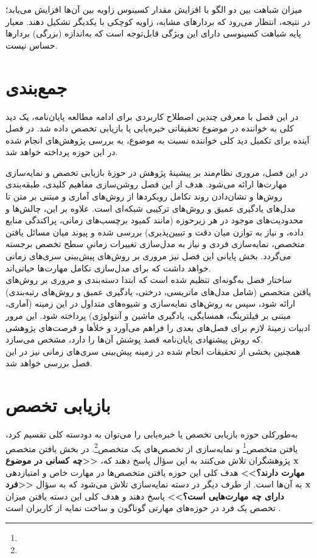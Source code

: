 میزان شباهت بین دو الگو با افزایش مقدار کسینوس زاویه بین آن‌ها افزایش می‌یابد؛ در نتیجه، انتظار می‌رود که بردارهای مشابه، زاویه کوچکی با یکدیگر تشکیل دهند. معیار پایه شباهت کسینوسی دارای این ویژگی قابل‌توجه است که به‌اندازه (بزرگی) بردارها حساس نیست.\cite{XIA201539}

\section{جمع‌بندی}
در این فصل با معرفی چندین اصطلاح کاربردی برای ادامه مطالعه پایان‌نامه، یک دید کلی به خواننده در موضوع تحقیقاتی خبره‌یابی یا بازیابی تخصص داده شد. در فصل آینده برای تکمیل دید کلی خواننده نسبت به موضوع، به بررسی پژوهش‌های انجام شده در این حوزه پرداخته خواهد شد. 


در این فصل، مروری نظام‌مند بر پیشینهٔ پژوهش در حوزهٔ بازیابی تخصص و نمایه‌سازی مهارت‌ها ارائه می‌شود. هدف از این فصل روشن‌سازی مفاهیم کلیدی، طبقه‌بندی روش‌ها و نشان‌دادن روند تکامل رویکردها از روش‌های آماری و مبتنی بر متن تا مدل‌های یادگیری عمیق و روش‌های ترکیبی شبکه‌ای است. علاوه بر این، چالش‌ها و محدودیت‌های موجود در هر زیرحوزه (مانند کمبود برچسب‌های زمانی، پراکندگی منابع داده، و نیاز به توازن میان دقت و تبیین‌پذیری) بررسی شده و پیوند میان مسائل یافتن متخصص، نمایه‌سازی فردی و نیاز به مدل‌سازی تغییرات زمانیِ سطح تخصص برجسته می‌گردد. بخش پایانی این فصل نیز مروری بر روش‌های پیش‌بینی سری‌های زمانی خواهد داشت که برای مدل‌سازی تکامل مهارت‌ها حیاتی‌اند.
\\
ساختار فصل به‌گونه‌ای تنظیم شده است که ابتدا دسته‌بندی و مروری بر روش‌های یافتن متخصص (شامل مدل‌های ماتریسی، درختی، یادگیری عمیق و روش‌های رتبه‌بندی) ارائه شود، سپس به روش‌های نمایه‌سازی و شیوه‌های متداول در این زمینه (آماری، مبتنی بر فیلترینگ، همسایگی، یادگیری ماشین و آنتولوژی) پرداخته شود. این مرور ادبیات زمینهٔ لازم برای فصل‌های بعدی را فراهم می‌آورد و خلأها و فرصت‌های پژوهشی که روش پیشنهادی پایان‌نامه قصد پوشش آن‌ها را دارد، مشخص می‌سازد.
\\
همچنین بخشی از تحقیقات انجام شده در زمینه پیش‌بینی سری‌های زمانی نیز در این فصل بررسی خواهد شد.


\section{بازیابی تخصص}
به‌طورکلی حوزه بازیابی تخصص یا خبره‌یابی را می‌توان به دودسته کلی تقسیم کرد، یافتن متخصص\footnote{} و نمایه‌سازی از تخصص‌های یک متخصص\footnote{}. در بخش یافتن متخصص پژوهشگران تلاش می‌کنند به این سؤال پاسخ دهند که، \textbf{<<چه کسانی در موضوع x مهارت دارند؟>> } هدف کلی این حوزه یافتن متخصص‌ها در مهارت خاص و امتیازدهی به آن‌ها است. از طرف دیگر در دسته نمایه‌سازی تلاش می‌شود که به سؤال \textbf{<<فرد x دارای چه مهارت‌هایی است؟>>} پاسخ دهند و هدف کلی این دسته یافتن میزان تخصص یک فرد در حوزه‌های مهارتی گوناگون و ساخت نمایه از کاربران است\cite{balog_expertise_2012} . 

